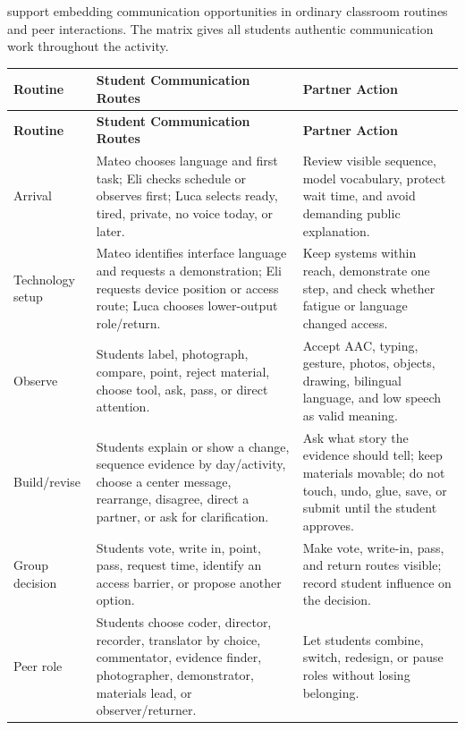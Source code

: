 \documentclass[11pt]{article}
\newcommand{\reviewsection}[1]{%
  \Needspace{4\baselineskip}
  \vspace{0.08in}\noindent{\normalsize\bfseries\color{PrimaryRed}#1}
  \par\vspace{0.025in}
}
\newcommand{\tableheaderthree}[3]{%
  \rowcolor{PrimaryRed}
  \color{white}\bfseries #1 &
  \color{white}\bfseries #2 &
  \color{white}\bfseries #3 \\
}
\begin{document}
\vspace{-0.2cm}
\reviewsection{Communication Opportunity Matrix}
\vspace{-0.2cm}
\citet{downing2015classroom} support embedding communication opportunities in ordinary classroom routines and peer interactions. The matrix gives all students authentic communication work throughout the activity.

\vspace{-0.2cm}
\renewcommand{\arraystretch}{1.0}
\setlength{\tabcolsep}{3pt}

\begin{longtable}{>{\RaggedRight\arraybackslash}p{0.84in} >{\RaggedRight\arraybackslash}p{3.37in} >{\RaggedRight\arraybackslash}p{2.84in}}
\tableheaderthree{Routine}{Student Communication Routes}{Partner Action}
\endfirsthead
\tableheaderthree{Routine}{Student Communication Routes}{Partner Action}
\endhead
Arrival & Mateo chooses language and first task; Eli checks schedule or observes first; Luca selects ready, tired, private, no voice today, or later. & Review visible sequence, model vocabulary, protect wait time, and avoid demanding public explanation. \\
\rowcolor{SoftGray}
Technology setup & Mateo identifies interface language and requests a demonstration; Eli requests device position or access route; Luca chooses lower-output role/return. & Keep systems within reach, demonstrate one step, and check whether fatigue or language changed access. \\
Observe & Students label, photograph, compare, point, reject material, choose tool, ask, pass, or direct attention. & Accept AAC, typing, gesture, photos, objects, drawing, bilingual language, and low speech as valid meaning. \\
\rowcolor{SoftGray}
Build/revise & Students explain or show a change, sequence evidence by day/activity, choose a center message, rearrange, disagree, direct a partner, or ask for clarification. & Ask what story the evidence should tell; keep materials movable; do not touch, undo, glue, save, or submit until the student approves. \\
Group decision & Students vote, write in, point, pass, request time, identify an access barrier, or propose another option. & Make vote, write-in, pass, and return routes visible; record student influence on the decision. \\
\rowcolor{SoftGray}
Peer role & Students choose coder, director, recorder, translator by choice, commentator, evidence finder, photographer, demonstrator, materials lead, or observer/returner. & Let students combine, switch, redesign, or pause roles without losing belonging. \\

\end{longtable}
\end{document}
